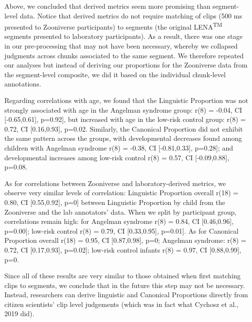 \documentclass[english,,man]{apa6}
\begin{document}
Above, we concluded that derived metrics seem more promising than segment-level data. Notice that derived metrics do not require matching of clips (500 ms presented to Zooniverse participants) to segments (the original LENA\textsuperscript{TM} segments presented to laboratory participants). As a result, there was one stage in our pre-processing that may not have been necessary, whereby we collapsed judgments across chunks associated to the same segment. We therefore repeated our analyses but instead of deriving our proportions for the Zooniverse data from the segment-level composite, we did it based on the individual chunk-level annotations.

Regarding correlations with age, we found that the Linguistic Proportion was not strongly associated with age in the Angelman syndrome group: r(8) = -0.04, CI {[}-0.65,0.61{]}, p=0.92{]}, but increased with age in the low-risk control group: r(8) = 0.72, CI {[}0.16,0.93{]}, p=0.02. Similarly, the Canonical Proportion did not exhibit the same pattern across the groups, with developmental decreases found among children with Angelman syndrome r(8) = -0.38, CI {[}-0.81,0.33{]}, p=0.28{]}; and developmental increases among low-risk control r(8) = 0.57, CI {[}-0.09,0.88{]}, p=0.08.

As for correlations between Zooniverse and laboratory-derived metrics, we observe very similar levels of correlation: Linguistic Proportion overall r(18) = 0.80, CI {[}0.55,0.92{]}, p=0{]} between Linguistic Proportion by child from the Zooniverse and the lab annotators' data. When we split by participant group, correlations remain high: for Angelman syndrome r(8) = 0.84, CI {[}0.46,0.96{]}, p=0.00{]}; low-risk control r(8) = 0.79, CI {[}0.33,0.95{]}, p=0.01{]}. As for Canonical Proportion overall r(18) = 0.95, CI {[}0.87,0.98{]}, p=0; Angelman syndrome: r(8) = 0.72, CI {[}0.17,0.93{]}, p=0.02{]}; low-risk control infants r(8) = 0.97, CI {[}0.88,0.99{]}, p=0.

Since all of these results are very similar to those obtained when first matching clips to segments, we conclude that in the future this step may not be necessary. Instead, researchers can derive linguistic and Canonical Proportions directly from citizen scientists' clip level judgements (which was in fact what Cychosz et al., 2019 did).
\end{document}
